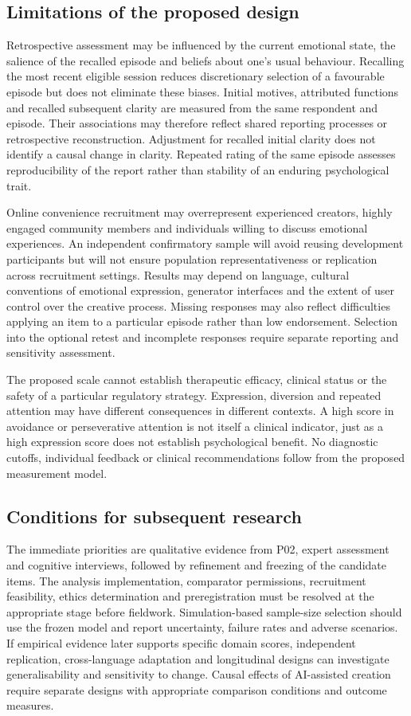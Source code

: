 \documentclass[11pt,a4paper]{article}
\begin{document}
\subsection{Limitations of the proposed design}
Retrospective assessment may be influenced by the current emotional state, the salience of the recalled episode and beliefs about one's usual behaviour. Recalling the most recent eligible session reduces discretionary selection of a favourable episode but does not eliminate these biases. Initial motives, attributed functions and recalled subsequent clarity are measured from the same respondent and episode. Their associations may therefore reflect shared reporting processes or retrospective reconstruction. Adjustment for recalled initial clarity does not identify a causal change in clarity. Repeated rating of the same episode assesses reproducibility of the report rather than stability of an enduring psychological trait.

Online convenience recruitment may overrepresent experienced creators, highly engaged community members and individuals willing to discuss emotional experiences. An independent confirmatory sample will avoid reusing development participants but will not ensure population representativeness or replication across recruitment settings. Results may depend on language, cultural conventions of emotional expression, generator interfaces and the extent of user control over the creative process. Missing responses may also reflect difficulties applying an item to a particular episode rather than low endorsement. Selection into the optional retest and incomplete responses require separate reporting and sensitivity assessment.

The proposed scale cannot establish therapeutic efficacy, clinical status or the safety of a particular regulatory strategy. Expression, diversion and repeated attention may have different consequences in different contexts. A high score in avoidance or perseverative attention is not itself a clinical indicator, just as a high expression score does not establish psychological benefit. No diagnostic cutoffs, individual feedback or clinical recommendations follow from the proposed measurement model.

\subsection{Conditions for subsequent research}
The immediate priorities are qualitative evidence from P02, expert assessment and cognitive interviews, followed by refinement and freezing of the candidate items. The analysis implementation, comparator permissions, recruitment feasibility, ethics determination and preregistration must be resolved at the appropriate stage before fieldwork. Simulation-based sample-size selection should use the frozen model and report uncertainty, failure rates and adverse scenarios. If empirical evidence later supports specific domain scores, independent replication, cross-language adaptation and longitudinal designs can investigate generalisability and sensitivity to change. Causal effects of AI-assisted creation require separate designs with appropriate comparison conditions and outcome measures.
\end{document}
